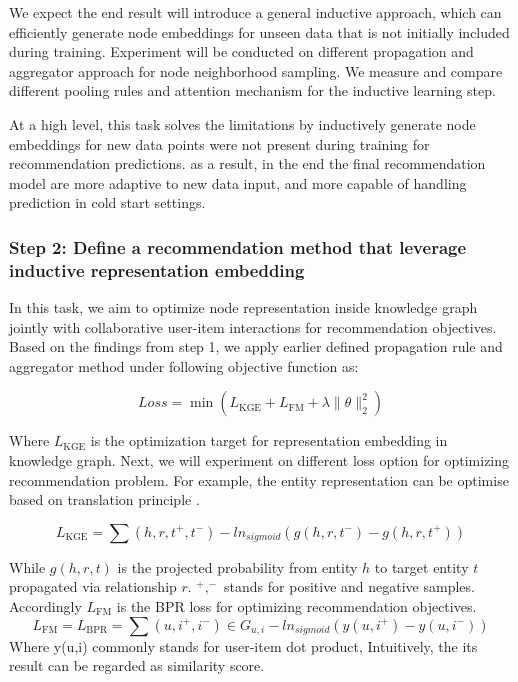 We expect the end result will introduce a general inductive approach, which can efficiently generate node embeddings for unseen data that is not initially included during training.
Experiment will be conducted on different propagation and aggregator approach for node neighborhood sampling. We measure and compare different pooling rules and attention mechanism for the inductive learning step. 

At a high level, this task solves the limitations by inductively generate node embeddings for new data points were not present during training for recommendation predictions. as a result, in the end the final recommendation model are more adaptive to new data input, and more capable of handling prediction in cold start settings.

\subsubsection*{Step 2: Define a recommendation method that leverage inductive representation embedding}
In this task, we aim to optimize node representation inside knowledge graph jointly with collaborative user-item interactions for recommendation objectives.
Based on the findings from step 1, we apply earlier defined propagation rule and aggregator method under following objective function as:

\begin{equation}
    Loss=\min{(L_\text{KGE}+L_\text{FM}+\lambda\|\theta\|^2_2)}
\end{equation}

Where $L_\text{KGE}$ is the optimization target for representation embedding in knowledge graph. Next, we will experiment on different loss option for optimizing recommendation problem. For example, the entity representation can be optimise based on translation principle \citep{lin2017learning}.

\begin{equation}
    L_\text{KGE}=\sum{(h,r,t^+,t^-)} -ln_{sigmoid}(g(h,r,t^-)-g(h,r,t^+))
\end{equation}

While $g(h,r,t)$ is the projected probability from entity $h$ to target entity $t$ propagated via relationship $r$. $^+,^-$ stands for positive and negative samples. Accordingly $L_\text{FM}$ is the BPR \citep{rendle2012bpr} loss for optimizing recommendation objectives.
\begin{equation}
    L_\text{FM} = L_\text{BPR}=\sum{(u,i^+,i^-) \in G_{u,i}} -ln_{sigmoid}(y(u,i^+)-y(u,i^-))
\end{equation}
Where y(u,i) commonly stands for user-item dot product, Intuitively, the its result can be regarded as similarity score.

